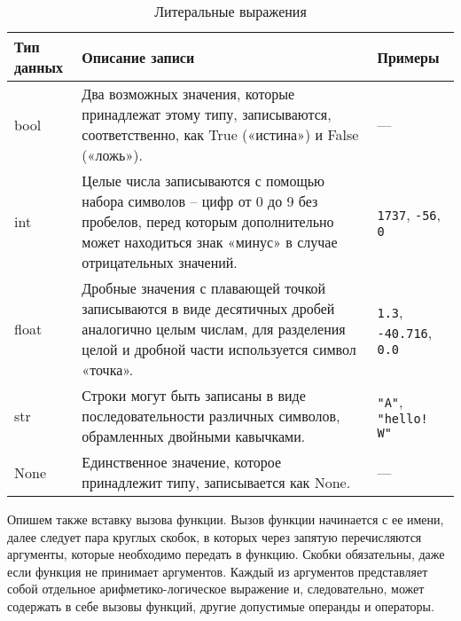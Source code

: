 \begin{table}[h]
    \centering
    \caption{Литеральные выражения}
    \label{tab:literals}
    \begin{tabular}{lp{8cm}p{4cm}}
        \toprule
        \textbf{Тип данных} & \textbf{Описание записи}                                                                                                                                                      & \textbf{Примеры}                       \\
        \midrule
        bool                & Два возможных значения, которые принадлежат этому типу, записываются, соответственно, как True («истина») и False («ложь»).                                                   & ---                                    \\
        \addlinespace
        int                 & Целые числа записываются с помощью набора символов -- цифр от 0 до 9 без пробелов, перед которым дополнительно может находиться знак «минус» в случае отрицательных значений. & \verb|1737|, \verb|-56|, \verb|0|      \\
        \addlinespace
        float               & Дробные значения с плавающей точкой записываются в виде десятичных дробей аналогично целым числам, для разделения целой и дробной части используется символ «точка».          & \verb|1.3|, \verb|-40.716|, \verb|0.0| \\
        \addlinespace
        str                 & Строки могут быть записаны в виде последовательности различных символов, обрамленных двойными кавычками.                                                                      & \verb|"A"|, \verb|"hello! W"|          \\
        \addlinespace
        None                & Единственное значение, которое принадлежит типу, записывается как None.                                                                                                       & ---                                    \\
        \bottomrule
    \end{tabular}
\end{table}

Опишем также вставку вызова функции.
Вызов функции начинается с ее имени, далее следует пара круглых скобок, в которых через запятую перечисляются аргументы, которые необходимо передать в функцию.
Скобки обязательны, даже если функция не принимает аргументов.
Каждый из аргументов представляет собой отдельное арифметико-логическое выражение и, следовательно, может содержать в себе вызовы функций, другие допустимые операнды и операторы.

